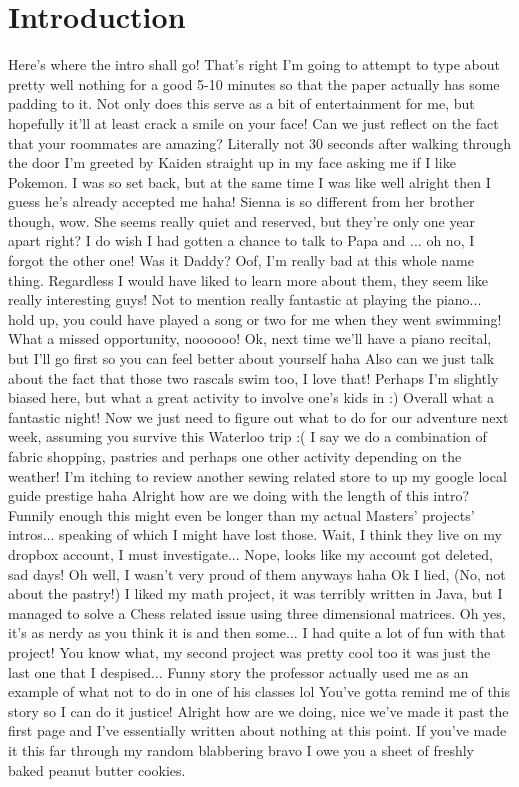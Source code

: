 \documentclass[]{article}
\begin{document}
\section{Introduction}
Here's where the intro shall go! That's right I'm going to attempt to type about pretty well nothing for a good 5-10 minutes so that the paper actually has some padding to it. Not only does this serve as a bit of entertainment for me, but hopefully it'll at least crack a smile on your face! Can we just reflect on the fact that your roommates are amazing? Literally not 30 seconds after walking through the door I'm greeted by Kaiden straight up in my face asking me if I like Pokemon. I was so set back, but at the same time I was like well alright then I guess he's already accepted me haha! Sienna is so different from her brother though, wow. She seems really quiet and reserved, but they're only one year apart right? I do wish I had gotten a chance to talk to Papa and ... oh no, I forgot the other one! Was it Daddy? Oof, I'm really bad at this whole name thing. Regardless I would have liked to learn more about them, they seem like really interesting guys! Not to mention really fantastic at playing the piano... hold up, you could have played a song or two for me when they went swimming! What a missed opportunity, noooooo! Ok, next time we'll have a piano recital, but I'll go first so you can feel better about yourself haha Also can we just talk about the fact that those two rascals swim too, I love that! Perhaps I'm slightly biased here, but what a great activity to involve one's kids in :) Overall what a fantastic night! Now we just need to figure out what to do for our adventure next week, assuming you survive this Waterloo trip :( I say we do a combination of fabric shopping, pastries and perhaps one other activity depending on the weather! I'm itching to review another sewing related store to up my google local guide prestige haha Alright how are we doing with the length of this intro? Funnily enough this might even be longer than my actual Masters' projects' intros... speaking of which I might have lost those. Wait, I think they live on my dropbox account, I must investigate... Nope, looks like my account got deleted, sad days! Oh well, I wasn't very proud of them anyways haha Ok I lied, (No, not about the pastry!) I liked my math project, it was terribly written in Java, but I managed to solve a Chess related issue using three dimensional matrices. Oh yes, it's as nerdy as you think it is and then some... I had quite a lot of fun with that project! You know what, my second project was pretty cool too it was just the last one that I despised... Funny story the professor actually used me as an example of what not to do in one of his classes lol You've gotta remind me of this story so I can do it justice! Alright how are we doing, nice we've made it past the first page and I've essentially written about nothing at this point. If you've made it this far through my random blabbering bravo I owe you a sheet of freshly baked peanut butter cookies.
\end{document}
